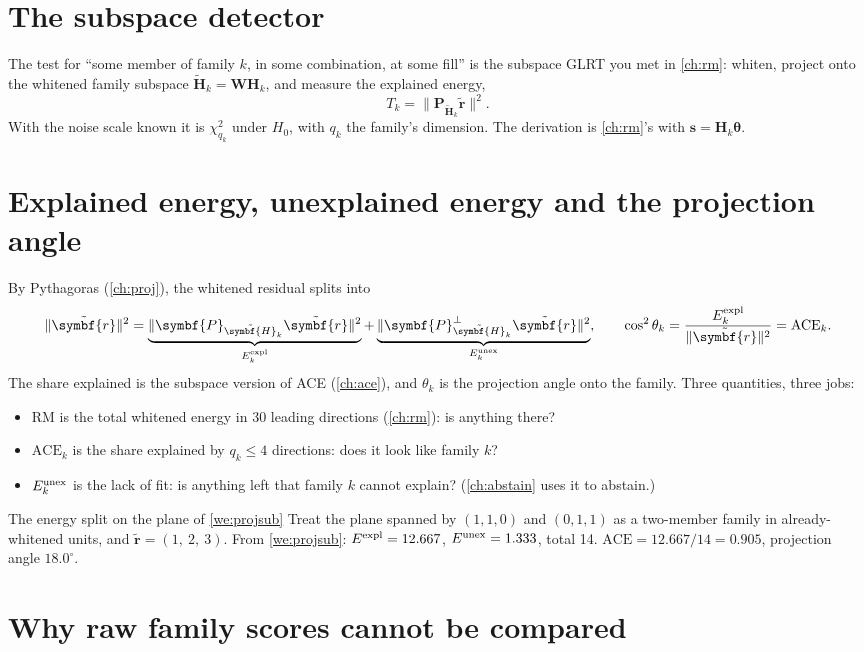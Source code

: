 \documentclass[11pt,a4paper,oneside,openany]{book}
\newcommand{\B}[1]{{\symbf{#1}}}
\newcommand{\B}[1]{{\bm{#1}}}
\newcommand{\nrm}[1]{\lVert #1\rVert}
\newcommand{\vr}{\B{r}}
\newcommand{\vs}{\B{s}}
\newcommand{\vtheta}{\B{\theta}}
\newcommand{\mW}{\B{W}}
\newcommand{\mH}{\B{H}}
\newcommand{\mP}{\B{P}}
\begin{document}
\section{The subspace detector}

The test for ``some member of family $k$, in some combination, at some fill'' is the subspace GLRT you met in \cref{ch:rm}: whiten, project onto the
whitened family subspace $\tilde{\mH}_k=\mW\mH_k$, and measure the explained energy,
\[
  T_k=\nrm{\mP_{\tilde{\mH}_k}\tilde{\vr}}^2 .
\]
With the noise scale known it is $\chi^2_{q_k}$ under $H_0$, with $q_k$ the family's dimension. The derivation is \cref{ch:rm}'s with $\vs=\mH_k\vtheta$.

\section{Explained energy, unexplained energy and the projection angle}

By Pythagoras (\cref{ch:proj}), the whitened residual splits into
\[
  \nrm{\tilde{\vr}}^2=\underbrace{\nrm{\mP_{\tilde{\mH}_k}\tilde{\vr}}^2}_{E^{\rm expl}_k}+\underbrace{\nrm{\mP^\perp_{\tilde{\mH}_k}\tilde{\vr}}^2}_{E^{\rm unex}_k},
  \qquad \cos^2\theta_k=\frac{E^{\rm expl}_k}{\nrm{\tilde{\vr}}^2}=\mathrm{ACE}_k .
\]
The share explained is the subspace version of ACE (\cref{ch:ace}), and $\theta_k$ is the projection angle onto the family. Three quantities, three
jobs:
\begin{itemize}
\item RM is the total whitened energy in 30 leading directions (\cref{ch:rm}): is anything there?
\item $\mathrm{ACE}_k$ is the share explained by $q_k\le4$ directions: does it look like family $k$?
\item $E^{\rm unex}_k$ is the lack of fit: is anything left that family $k$ cannot explain? (\cref{ch:abstain} uses it to abstain.)
\end{itemize}

\begin{worked}[label=we:energy]{The energy split on the plane of \cref{we:projsub}}
Treat the plane spanned by $(1,1,0)$ and $(0,1,1)$ as a two-member family in already-whitened units, and $\tilde{\vr}=(1,\ 2,\ 3)$. From
\cref{we:projsub}: $E^{\rm expl}=12.667$, $E^{\rm unex}=1.333$, total 14. $\mathrm{ACE}=12.667/14=0.905$, projection angle $18.0^\circ$.
\end{worked}

\section{Why raw family scores cannot be compared}
\end{document}
